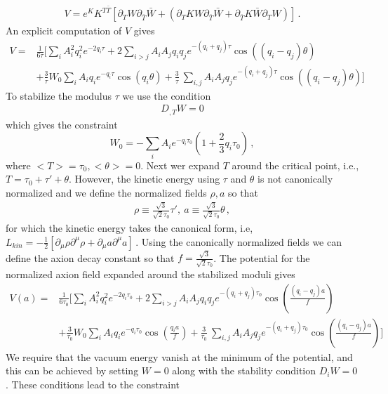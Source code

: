 \documentclass[12pt]{article}
\begin{document}
\begin{align}
  V= e^K K^{T\bar T} \left[\partial_TW \partial_{\bar T} \bar W +
    (\partial_TK W \partial_{\bar T} \bar W +
    \partial_{\bar T} K \bar W \partial_{T} W) \right]\,.
\end{align}
An explicit computation of $V$ gives
\begin{align}
  V= & \frac{1}{6\tau} \Big [ \sum_{i} A^2_i q^2_i e^{- 2q_i \tau } + 2 \sum_{i>j} A_iA_j q_iq_j e^{-(q_i+q_j)\tau} \cos\left((q_i-q_j) \theta\right)\nonumber\\
     & + \frac{3}{\tau} W_0 \sum_i A_i q_i e^{-q_i \tau} \cos(q_i \theta)
    + \frac{3}{\tau} \
    \sum_{i,j} A_i A_j q_j e^{-(q_i + q_j) \tau} \cos((q_i -q_j)\theta)
    \Big]
  \label{11}
\end{align}
To stabilize the modulus $\tau$ we use the condition~\cite{Nath:1983aw}
\begin{align}
  D_{,T} W =0
  \label{33.1}
\end{align}
which gives the constraint
\begin{equation}\label{eqn:crit}
  W_0 = -\sum_i A_i e^{-q_i\tau_0} \left(1 + \frac{2}{3} q_i \tau_0\right)\, ,
\end{equation}
where $<T>=\tau_0, <\theta>=0$.
Next wer expand $T$ around the critical point, i.e.,
$T= \tau_0 + \tau' + \theta$. However, the kinetic energy using $\tau$ and $\theta$ is not canonically normalized
and we define the normalized fields $\rho, a$ so that
\begin{align}
  \rho \equiv \frac{\sqrt 3}{\sqrt 2 \tau_0} \tau',~ a \equiv \frac{\sqrt 3}{\sqrt 2 \tau_0}\theta\,,
  \label{19}
\end{align}
for which the kinetic energy takes the canonical form, i.e,
$L_{kin}=
  - \frac{1}{2}
  \left[\partial_\mu \rho \partial^\mu \rho + \partial_\mu a \partial^\mu a\right]\,.$ Using the canonically normalized fields
we can define the axion decay constant so that $f= \frac{\sqrt 3}{\sqrt 2 \tau_0}$.
The potential for the normalized axion field expanded around the stabilized moduli gives
\begin{align}
  V(a)= & \frac{1}{6\tau_0} \Big [ \sum_{i} A^2_i q^2_i e^{- 2q_i \tau_0 } + 2 \sum_{i>j} A_iA_j q_iq_j e^{-(q_i+q_j)\tau_0}
    \cos\left(\frac{(q_i-q_j) a}{f}\right)\nonumber\\
        & + \frac{3}{\tau_0} W_0 \sum_i A_i q_i e^{-q_i \tau_0} \cos(\frac{q_i a}{f})
    + \frac{3}{\tau_0} \
    \sum_{i,j} A_i A_j q_j e^{-(q_i + q_j) \tau_0} \cos\left(\frac{(q_i -q_j)a}{f}\right)
    \Big]
  \label{24}
\end{align}
We require that the vacuum energy vanish at the minimum of the potential, and this can be achieved by setting $W=0$ along with the
stability condition $D_i W =0$. These conditions lead to the constraint
\end{document}
